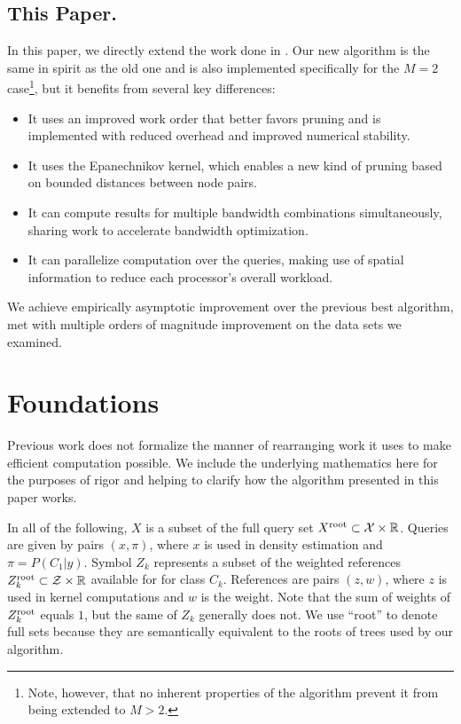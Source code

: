 \documentclass[twoside,leqno,twocolumn]{article}
\newcommand{\kdroot}[1]{#1^{\rm root}}
\begin{document}
\subsection{This Paper.}
In this paper, we directly extend the work done in
\cite{nbc-compstat}.  Our new algorithm is the same in spirit as the
old one and is also implemented specifically for the $M = 2$
case\footnote{Note, however, that no inherent properties of the
algorithm prevent it from being extended to $M > 2$.}, but it benefits
from several key differences:
\begin{itemize}
\item It uses an improved work order that better favors pruning and is
  implemented with reduced overhead and improved numerical stability.
\item It uses the Epanechnikov kernel, which enables a new kind of
  pruning based on bounded distances between node pairs.
\item It can compute results for multiple bandwidth combinations
  simultaneously, sharing work to accelerate bandwidth optimization.
\item It can parallelize computation over the queries, making use of
  spatial information to reduce each processor's overall workload.
\end{itemize}
We achieve empirically asymptotic improvement over the previous best
algorithm, met with multiple orders of magnitude improvement on the
data sets we examined.

\section{Foundations}\label{sec:math}
Previous work \cite{nbc-compstat} does not formalize the manner of
rearranging work it uses to make efficient computation possible.  We
include the underlying mathematics here for the purposes of rigor and
helping to clarify how the algorithm presented in this paper works.

In all of the following, $X$ is a subset of the full query set
$\kdroot{X} \subset \mathcal{X} \times \mathbb{R}$.  Queries are given
by pairs $(x,\pi)$, where $x$ is used in density estimation and $\pi =
P(C_1|y)$.  Symbol $Z_k$ represents a subset of the weighted
references $\kdroot{Z_k} \subset \mathcal{Z} \times \mathbb{R}$
available for for class $C_k$.  References are pairs $(z,w)$, where
$z$ is used in kernel computations and $w$ is the weight.  Note that
the sum of weights of $\kdroot{Z_k}$ equals $1$, but the same of $Z_k$
generally does not.  We use ``root'' to denote full sets because they
are semantically equivalent to the roots of trees used by our
algorithm.
\end{document}
